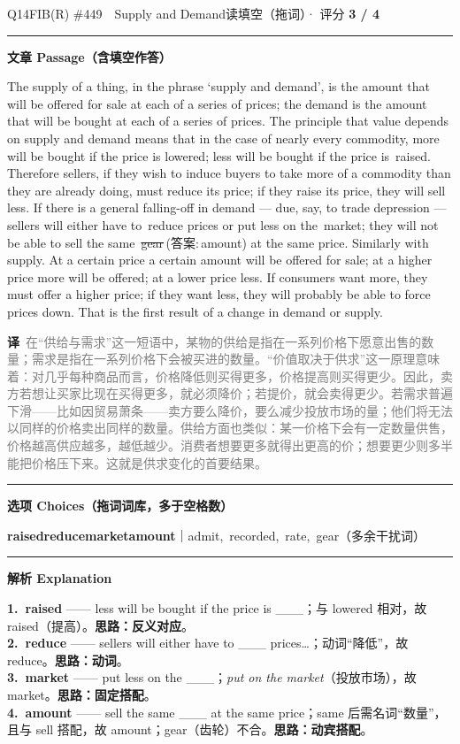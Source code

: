 \documentclass[11pt]{article}
\newcommand{\ptesub}[1]{%
  \par\needspace{2\baselineskip}\smallskip
  {\color{cAccent}\rule[-0.2ex]{3pt}{1.05em}}\hspace{6pt}%
  {\bfseries\color{cHead}#1}\par\nopagebreak\smallskip}
\newcommand{\zh}[1]{{\footnotesize\textcolor{cNote}{\textbf{译}}\ \textcolor{gray}{#1}}}
\newcommand{\rok}[1]{{\color{cFix}\ding{51}\,#1}}                 %
\newcommand{\rno}[2]{{\color{cWrong}\ding{55}\,\sout{#1}}\,{\footnotesize\color{cFix}(答案:\,#2)}}  %
\begin{document}
\begin{qblock}{Q14\quad FIB(R) \#449\ \ Supply and Demand}{读填空（拖词）· 评分 \textcolor{cAccent}{\bfseries 3 / 4}}
\ptesub{文章 Passage（含填空作答）}
\begin{promptbox}
The supply of a thing, in the phrase `supply and demand', is the amount that will be offered for sale at each of a series of prices; the demand is the amount that will be bought at each of a series of prices. The principle that value depends on supply and demand means that in the case of nearly every commodity, more will be bought if the price is lowered; less will be bought if the price is \rok{raised}. Therefore sellers, if they wish to induce buyers to take more of a commodity than they are already doing, must reduce its price; if they raise its price, they will sell less. If there is a general falling-off in demand --- due, say, to trade depression --- sellers will either have to \rok{reduce} prices or put less on the \rok{market}; they will not be able to sell the same \rno{gear}{amount} at the same price. Similarly with supply. At a certain price a certain amount will be offered for sale; at a higher price more will be offered; at a lower price less. If consumers want more, they must offer a higher price; if they want less, they will probably be able to force prices down. That is the first result of a change in demand or supply.
\end{promptbox}
\zh{在“供给与需求”这一短语中，某物的供给是指在一系列价格下愿意出售的数量；需求是指在一系列价格下会被买进的数量。“价值取决于供求”这一原理意味着：对几乎每种商品而言，价格降低则买得更多，价格提高则买得更少。因此，卖方若想让买家比现在买得更多，就必须降价；若提价，就会卖得更少。若需求普遍下滑——比如因贸易萧条——卖方要么降价，要么减少投放市场的量；他们将无法以同样的价格卖出同样的数量。供给方面也类似：某一价格下会有一定数量供售，价格越高供应越多，越低越少。消费者想要更多就得出更高的价；想要更少则多半能把价格压下来。这就是供求变化的首要结果。}
\ptesub{选项 Choices（拖词词库，多于空格数）}
{\small \textbf{raised}\quad \textbf{reduce}\quad \textbf{market}\quad \textbf{amount}\quad ｜\quad admit,\ recorded,\ rate,\ gear（多余干扰词）}
\ptesub{解析 Explanation}
\begin{notebox}\footnotesize
\textbf{1.\ raised} —— less will be bought if the price is \_\_\_；与 lowered 相对，故 raised（提高）。\textbf{思路：反义对应}。\\[2pt]
\textbf{2.\ reduce} —— sellers will either have to \_\_\_ prices…；动词“降低”，故 reduce。\textbf{思路：动词}。\\[2pt]
\textbf{3.\ market} —— put less on the \_\_\_；\emph{put on the market}（投放市场），故 market。\textbf{思路：固定搭配}。\\[2pt]
\textbf{4.\ amount} —— sell the same \_\_\_ at the same price；same 后需名词“数量”，且与 sell 搭配，故 amount；gear（齿轮）不合。\textbf{思路：动宾搭配}。
\end{notebox}
\end{qblock}
\end{document}
